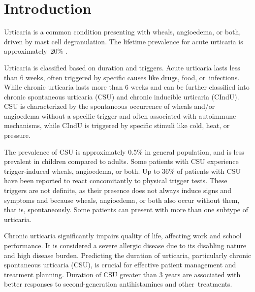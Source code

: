 \documentclass[preprint,12pt,authoryear]{elsarticle}
\begin{document}

\sloppy %

\section{Introduction}\label{Introduction}

Urticaria is a common condition presenting with wheals, angioedema, or both, driven by mast cell degranulation\citep{Zuberbier2021The,RadonjicHoesli2018Urticaria,Ring2012Urticaria}. The lifetime prevalence for acute urticaria is approximately 20\% \citep{Zuberbier2021The}. 

Urticaria is classified based on duration and triggers. Acute urticaria lasts less than 6 weeks, often triggered by specific causes like drugs, food, or infections. While chronic urticaria lasts more than 6 weeks and can be further classified into chronic spontaneous urticaria (CSU) and chronic inducible urticaria (CIndU)\citep{Zuberbier2021The,Ring2012Urticaria}. 
CSU is characterized by the spontaneous occurrence of wheals and/or angioedema without a specific trigger and often associated with autoimmune mechanisms\citep{Schettini2023Urticaria}, while CIndU is triggered by specific stimuli like cold, heat, or pressure\citep{Pozderac2020Chronic}. 

The prevalence of CSU is approximately 0.5\% in general population, and is less prevalent in children compared to adults\citep{Balp2015The, Poddighe2019LETTER, Labbene2023Prevalence}. Some patients with CSU experience trigger-induced wheals, angioedema, or both. Up to 36\% of patients with CSU have been reported to react concomitantly to physical trigger tests\citep{Dressler2018Chronic}. These triggers are not definite, as their presence does not always induce signs and symptoms and because wheals, angioedema, or both also occur without them, that is, spontaneously. Some patients can present with more than one subtype of urticaria\citep{Zuberbier2021The}. 


Chronic urticaria significantly impairs quality of life, affecting work and school performance. It is considered a severe allergic disease due to its disabling nature and high disease burden\citep{Zuberbier2021The}. Predicting the duration of urticaria, particularly chronic spontaneous urticaria (CSU), is crucial for effective patient management and treatment planning. 
Duration of CSU greater than 3 years are associated with better responses to second-generation antihistamines and other treatments\citep{Chiang2022Predictors}.
\end{document}

